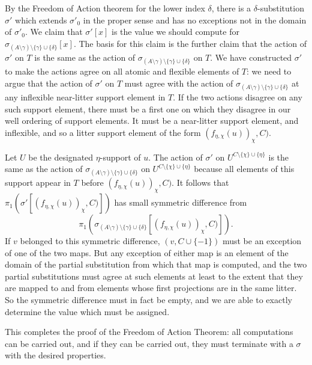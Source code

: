 \documentclass[12pt]{article}
\begin{document}
\begin{enumerate}
By the Freedom of Action theorem for the lower index $\delta$, there is a $\delta$-substitution $\sigma'$ which extends $\sigma'_0$ in the proper sense and has no exceptions not in the domain of $\sigma'_0$.  We claim that $\sigma'[x]$ is the value we should compute for $\sigma_{(A \setminus \gamma)\setminus \{\gamma\}\cup \{\delta\}}[x]$.
The basis for this claim is the further claim that the action of $\sigma'$ on $T$ is the same as the action of $\sigma_{(A \setminus \gamma)\setminus \{\gamma\}\cup \{\delta\}}$ on $T$.  We have constructed $\sigma'$ to make the actions agree on all atomic and flexible elements of $T$:  we need to argue that the action of $\sigma'$ on $T$ must agree with the action of $\sigma_{(A \setminus \gamma)\setminus \{\gamma\}\cup \{\delta\}}$ at any inflexible near-litter support element in $T$.  If the two actions disagree on any such support element, there must be a first one on which they disagree in our well ordering of support elements.  It must be a near-litter support element, and inflexible, and so a litter support element of the form $(f_{\eta,\chi}(u))_\chi,C)$.

Let $U$ be the designated $\eta$-support of $u$.  The action of $\sigma'$ on $U^{C \setminus \{\chi\} \cup \{\eta\}}$ is the same as the action of $\sigma_{(A \setminus \gamma)\setminus \{\gamma\}\cup \{\delta\}}$ on $U^{C \setminus \{\chi\} \cup \{\eta\}}$ because all elements of this support appear in $T$ before $(f_{\eta,\chi}(u))_\chi,C)$.  It follows
that $\pi_1(\sigma'[(f_{\eta,\chi}(u))_\chi,C)])$ has small symmetric difference from $$\pi_1(\sigma_{(A \setminus \gamma)\setminus \{\gamma\}\cup \{\delta\}}[(f_{\eta,\chi}(u))_\chi,C)]).$$  If $v$ belonged to this symmetric difference, $(v,C \cup\{-1\})$ must be an exception of one of the two maps.   But any exception of either map is an element of the domain
of the partial substitution from which that map is computed, and the two partial substitutions must agree at such elements at least to the extent that they are mapped to and from elements whose first projections are in the same litter.  So the symmetric difference must in fact be empty, and we are able to exactly determine the value which must be assigned.

This completes the proof of the Freedom of Action Theorem:  all computations can be carried out, and if they can be carried out, they must terminate with a $\sigma$ with the desired properties.








\end{enumerate}
\end{document}
